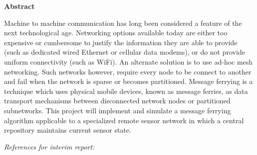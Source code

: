 \begin{center}
\textbf{Abstract}
\end{center}

Machine to machine communication has long been considered a feature of the next technological age. 
Networking options available today are either too expensive or cumbersome to justify the information they are able to provide (such as dedicated wired Ethernet or cellular data modems), or do not provide uniform connectivity (such as WiFi). 
An alternate solution is to use ad-hoc mesh networking. 
Such networks however, require every node to be connect to another and fail when the network is sparse or becomes partitioned.
Message ferrying is a technique which uses physical mobile devices, known as message ferries, as data transport mechanisms between disconnected network nodes or partitioned subnetworks.
This project will implement and simulate a message ferrying algorithm applicable to a specialized remote sensor network in which a central repository maintains current sensor state.

\emph{References for interim report:}
~\cite{adhocmsgferry}
~\cite{hybrid}
~\cite{Routing}
~\cite{wearable}
~\cite{QoSrouting}
~\cite{efficientrouting}
~\cite{implement}
~\cite{book1}